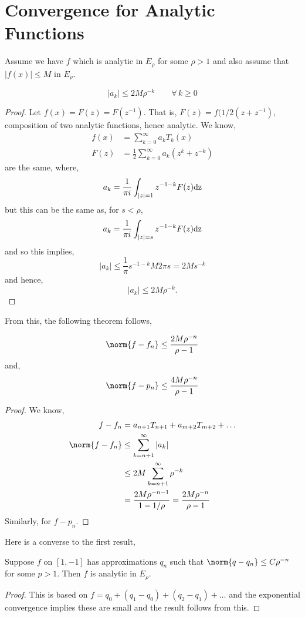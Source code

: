 
\section{Convergence for Analytic Functions}
Assume we have $f$ which is analytic in $E_\rho$ for some $\rho > 1$ and also assume that $|f(x)| \le M$ in $E_\rho$.

\begin{nthm}[Bernstein]
  $$ |a_k| \le 2M\rho^{-k}\qquad \forall\, k \ge 0 $$
\end{nthm}
\begin{proof}
  Let $f(x) = F(z) = F(z^{-1})$. That is, $F(z) = f(1/2(z + z^{-1})$, composition of two analytic functions, hence analytic. We know,
  \begin{align*}
    f(x) &= \sum_{k=0}^\infty a_kT_k(x) \\
    F(z) &= \frac{1}{2}\sum_{k=0}^\infty a_k(z^k + z^{-k})
  \end{align*}
  are the same, where,
  $$ a_k = \frac{1}{\pi i} \int_{|z| = 1} z^{-1-k}F(z)\rm d z $$
  but this can be the same as, for $s < \rho$,
  $$ a_k = \frac{1}{\pi i}\int_{|z| = s} z^{-1-k}F(z)\rm d z $$
  and so this implies,
  $$ |a_k| \le \frac{1}{\pi}s^{-1-k}M 2\pi s = 2Ms^{-k} $$
  and hence,
  $$ |a_k| \le 2M\rho^{-k}. $$
\end{proof}
From this, the following theorem follows,
\begin{nthm}
  $$ \norm{f - f_n} \le \frac{2M \rho^{-n}}{\rho - 1} $$
  and,
  $$ \norm{f - p_n} \le \frac{4M \rho^{-n}}{\rho -1} $$
\end{nthm}
\begin{proof}
  We know,
  \begin{align*}
    f - f_n &= a_{n+1}T_{n+1} + a_{m+2}T_{m+2}+\dots \\
    \norm{f - f_n} &\le \sum_{k=n+1}^\infty |a_k| \\
    &\le 2M \sum_{k=n+1}^\infty \rho^{-k} \\
    &= \frac{2M\rho^{-n-1}}{1 - 1/\rho} = \frac{2M \rho^{-n}}{\rho - 1}
  \end{align*}
  Similarly, for $f - p_n$.
\end{proof}

\noindent
Here is a converse to the first result,
\begin{nthm}
  Suppose $f$ on $[1, -1]$ has approximations $q_n$ such that $\norm{q - q_n} \le C \rho^{-n}$ for some $p > 1$. Then $f$ is analytic in $E_\rho$.
\end{nthm}
\begin{proof}
  This is based on $f = q_0 + (q_1 - q_0) + (q_2 - q_1) + \dots$ and the exponential convergence implies these are small and the result follows from this.
\end{proof}

